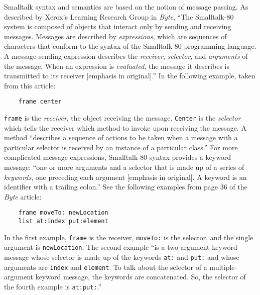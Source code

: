 \documentclass[acmsmall,screen]{acmart}
\begin{document}
Smalltalk syntax and semantics are based on the notion of message passing. As described by Xerox's Learning Research Group in \emph{Byte}, ``The Smalltalk-80 system is composed of objects that interact only by sending and receiving messages.\textellipsis{} Messages are described by \textit{expressions}, which are sequences of characters that conform to the syntax of the Smalltalk-80 programming language. A message-sending expression describes the \textit{receiver}, \textit{selector}, and \textit{arguments} of the message. When an expression is \textit{evaluated}, the message it describes is transmitted to its receiver [emphasis in original].'' \citep[36]{xerox_learning_research_group_smalltalk-80_1981} In the following example, taken from this article:
\begin{verbatim}
    frame center
\end{verbatim}
\verb|frame| is the \textit{receiver}, the object receiving the message. \verb|Center| is the \textit{selector} which tells the receiver which method to invoke upon receiving the message. A method ``describes a sequence of actions to be taken when a message with a particular selector is received by an instance of a particular class.''  \citep[39]{xerox_learning_research_group_smalltalk-80_1981} For more complicated message expressions, Smalltalk-80 syntax provides a keyword message: ``\textellipsis{}one or more arguments and a selector that is made up of a series of \emph{keywords}, one preceding each argument [emphasis in original]. A keyword is an identifier with a trailing colon.''  \citep[36--37]{xerox_learning_research_group_smalltalk-80_1981} See the following examples from page 36 of the \emph{Byte} article:
\begin{verbatim}
    frame moveTo: newLocation
    list at:index put:element
\end{verbatim}
In the first example, \verb|frame| is the receiver, \verb|moveTo:| is the selector, and the single argument is \verb|newLocation|. The second example ``is a two-argument keyword message whose selector is made up of the keywords \verb|at:| and \verb|put:| and whose arguments are \verb|index| and \verb|element|. To talk about the selector of a multiple-argument keyword message, the keywords are concatenated. So, the selector of the fourth example is \verb|at:put:|.'' \citep[37]{xerox_learning_research_group_smalltalk-80_1981}
\end{document}
